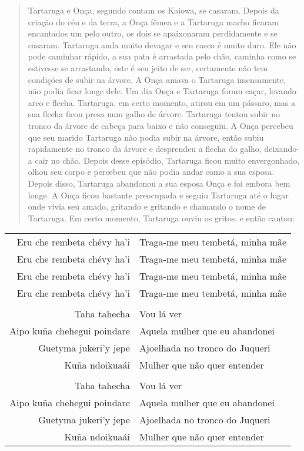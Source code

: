 \begin{quote}
Tartaruga e Onça, segundo contam os Kaiowa, se casaram. Depois da
criação do céu e da terra, a Onça fêmea e a Tartaruga macho ficaram
encantados um pelo outro, os dois se apaixonaram perdidamente e se
casaram. Tartaruga anda muito devagar e seu casco é muito duro. Ele não
pode caminhar rápido, a sua pata é arrastada pelo chão, caminha como se
estivesse se arrastando, este é seu jeito de ser, certamente não tem
condições de subir na árvore. A Onça amava o Tartaruga imensamente, não
podia ficar longe dele. Um dia Onça e Tartaruga foram caçar, levando
arco e flecha. Tartaruga, em certo momento, atirou em um pássaro, mas a
sua flecha ficou presa num galho de árvore. Tartaruga tentou subir no
tronco da árvore de cabeça para baixo e não conseguiu. A Onça percebeu
que seu marido Tartaruga não podia subir na árvore, então subiu
rapidamente no tronco da árvore e desprendeu a flecha do galho,
deixando-a cair no chão. Depois desse episódio, Tartaruga ficou muito
envergonhado, olhou seu corpo e percebeu que não podia andar como a sua
esposa. Depois disso, Tartaruga abandonou a sua esposa Onça e foi embora
bem longe. A Onça ficou bastante preocupada e seguiu Tartaruga até o
lugar onde vivia seu amado, gritando e gritando e chamando o nome de
Tartaruga. Em certo momento, Tartaruga ouviu os gritos, e então cantou:
\end{quote}


\begin{table}[]
\begin{tabular}{rl}
Eru che rembeta chévy ha'i          & Traga-me meu tembetá, minha mãe           \\
Eru che rembeta chévy ha'i          & Traga-me meu tembetá, minha mãe           \\
Eru che rembeta chévy ha'i  		& Traga-me meu tembetá, minha mãe \\
Eru che rembeta chévy ha'i 			& Traga-me meu tembetá, minha mãe   \\
                  &                     \\
Taha tahecha         & Vou lá ver           \\
Aipo kuña chehegui poindare         & Aquela mulher que eu abandonei           \\
Guetyma jukeri'y jepe  & Ajoelhada no tronco do Juqueri\footnotemark{} \\
Kuña ndoikuaái & Mulher que não quer entender   \\
                  &                     \\
Taha tahecha         & Vou lá ver           \\
Aipo kuña chehegui poindare         & Aquela mulher que eu abandonei           \\
Guetyma jukeri'y jepe  & Ajoelhada no tronco do Juqueri \\
Kuña ndoikuaái & Mulher que não quer entender   \\
\end{tabular}
\end{table}

